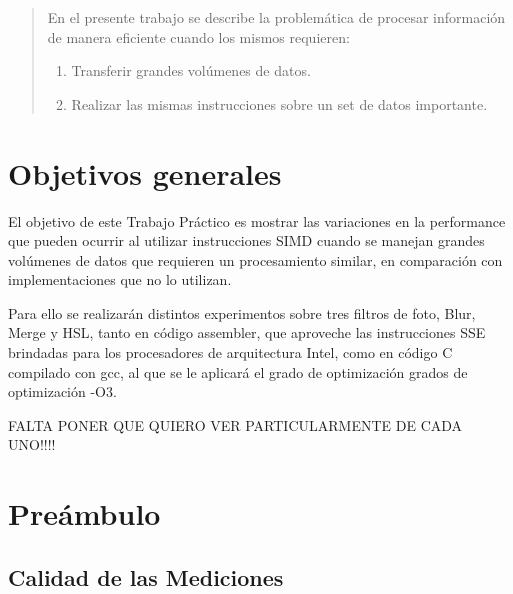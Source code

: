 \documentclass[a4paper]{article}
\begin{document}
\thispagestyle{empty}

\maketitle
\newpage

\thispagestyle{empty}
\vfill
\begin{abstract}
En el presente trabajo se describe la problemática de procesar información de manera eficiente cuando los mismos requieren:
\begin{enumerate}
\item Transferir grandes volúmenes de datos.
\item Realizar las mismas instrucciones sobre un set de datos importante.
\end{enumerate}
\end{abstract}
\thispagestyle{empty}
\vspace{3cm}
\tableofcontents
\newpage

\section{Objetivos generales}
El objetivo de este Trabajo Práctico es mostrar las variaciones en la performance que pueden ocurrir al utilizar instrucciones SIMD cuando se manejan grandes volúmenes de datos que requieren un procesamiento similar, en comparación con implementaciones que no lo utilizan.

Para ello se realizarán distintos experimentos sobre tres filtros de foto, Blur, Merge y HSL, tanto en código assembler, que aproveche las instrucciones SSE brindadas para los procesadores de arquitectura Intel, como en código C compilado con gcc, al que se le aplicará el grado de optimización grados de optimización -O3.

FALTA PONER QUE QUIERO VER PARTICULARMENTE DE CADA UNO!!!!


\newpage
\section{Preámbulo}

\subsection{Calidad de las Mediciones}
\end{document}
